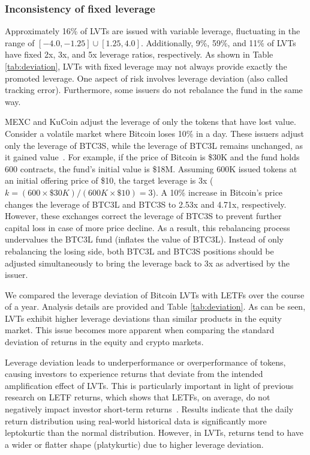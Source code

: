 \subsubsection{Inconsistency of fixed leverage}
Approximately 16\% of LVTs are issued with variable leverage, fluctuating in the range of $\left[-4.0, -1.25 \right] \cup \left[ 1.25, 4.0 \right]$. Additionally, 9\%, 59\%, and 11\% of LVTs have fixed 2x, 3x, and 5x leverage ratios, respectively. As shown in Table \ref{tab:deviation}, LVTs with fixed leverage may not always provide exactly the promoted leverage. One aspect of risk involves leverage deviation (also called tracking error). Furthermore, some issuers do not rebalance the fund in the same way.
\begin{example}
	MEXC and KuCoin adjust the leverage of only the tokens that have lost value. Consider a volatile market where Bitcoin loses 10\% in a day. These issuers adjust only the leverage of BTC3S, while the leverage of BTC3L remains unchanged, as it gained value~\cite{MEXC_Guide,KuCoin_Leverage}. For example, if the price of Bitcoin is \$30K and the fund holds 600 contracts, the fund's initial value is \$18M. Assuming 600K issued tokens at an initial offering price of \$10, the target leverage is 3x (\ie \(k=(600\times{\$30K})/(600K\times{\$10})=3\)). A 10\% increase in Bitcoin's price changes the leverage of BTC3L and BTC3S to 2.53x and 4.71x, respectively. However, these exchanges correct the leverage of BTC3S to prevent further capital loss in case of more price decline. As a result, this rebalancing process undervalues the BTC3L fund (\ie inflates the value of BTC3L). Instead of only rebalancing the losing side, both BTC3L and BTC3S positions should be adjusted simultaneously to bring the leverage back to 3x as advertised by the issuer.
\end{example}


We compared the leverage deviation of Bitcoin LVTs with LETFs over the course of a year. Analysis details are provided and Table \ref{tab:deviation}. As can be seen, LVTs exhibit higher leverage deviations than similar products in the equity market. This issue becomes more apparent when comparing the standard deviation of returns in the equity and crypto markets. 

Leverage deviation leads to underperformance or overperformance of tokens, causing investors to experience returns that deviate from the intended amplification effect of LVTs. This is particularly important in light of previous research on LETF returns, which shows that LETFs, on average, do not negatively impact investor short-term returns~\cite{loviscek2014leveraged}. Results indicate that the daily return distribution using real-world historical data is significantly more leptokurtic than the normal distribution. However, in LVTs, returns tend to have a wider or flatter shape (platykurtic) due to higher leverage deviation.

